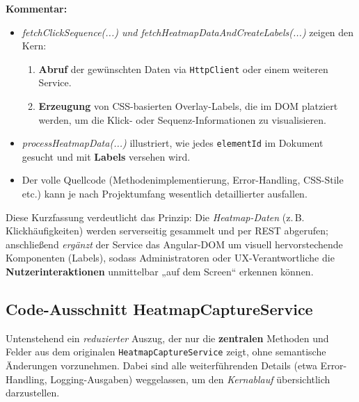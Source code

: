\documentclass[12pt,oneside]{article}
\begin{document}
\noindent
\textbf{Kommentar:}
\begin{itemize}
  \item \emph{fetchClickSequence(...) und fetchHeatmapDataAndCreateLabels(...)} zeigen den Kern: 
  \begin{enumerate}
    \item \textbf{Abruf} der gewünschten Daten via \lstinline|HttpClient| oder einem weiteren Service.
    \item \textbf{Erzeugung} von CSS-basierten Overlay-Labels, die im DOM platziert werden, um die Klick- oder Sequenz-Informationen zu visualisieren.
  \end{enumerate}
  \item \emph{processHeatmapData(...)} illustriert, wie jedes \lstinline|elementId| im Dokument gesucht und mit \textbf{Labels} versehen wird.
  \item Der volle Quellcode (Methodenimplementierung, Error-Handling, CSS-Stile etc.) kann je nach Projektumfang wesentlich detaillierter ausfallen.
\end{itemize}

Diese Kurzfassung verdeutlicht das Prinzip: Die \emph{Heatmap-Daten} (z.\,B. Klickhäufigkeiten) werden serverseitig gesammelt und per REST abgerufen; anschließend \emph{ergänzt} der Service das Angular-DOM um visuell hervorstechende Komponenten (Labels), sodass Administratoren oder UX-Verantwortliche die \textbf{Nutzerinteraktionen} unmittelbar „auf dem Screen“ erkennen können.

\subsection{Code-Ausschnitt HeatmapCaptureService}
\label{subsec:heatmap_capture_service_summary}

Untenstehend ein \emph{reduzierter} Auszug, der nur die \textbf{zentralen} Methoden und Felder aus dem originalen \lstinline|HeatmapCaptureService| zeigt, ohne semantische Änderungen vorzunehmen. Dabei sind alle weiterführenden Details (etwa Error-Handling, Logging-Ausgaben) weggelassen, um den \emph{Kernablauf} übersichtlich darzustellen.
\end{document}
